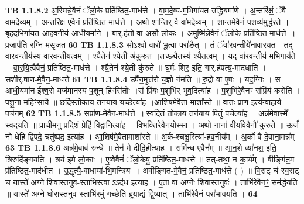 \documentclass[17pt]{extarticle}
\begin{document}
                                \textbf{ TB 1.1.8.2} \newline
                  अ॒स्मिन्ने॒वैनं॑ ॅलो॒के प्रति॑ष्ठित॒-माध॑त्ते । वा॒म॒दे॒व्य-म॒भिगा॑यत उद्ध्रि॒यमा॑णे । अ॒न्तरि॑क्षं॒ ॅवै वा॑मदे॒व्यम् । अ॒न्तरि॑क्ष ए॒वैनं॒ प्रति॑ष्ठित॒-माध॑त्ते । अथो॒ शान्ति॒र् वै वा॑मदे॒व्यम् । शा॒न्तमे॒वैनं॑ पश॒व्य॑मुद्ध॑रते । बृ॒हद॒भिगा॑यत आहव॒नीय॑ आधी॒यमा॑ने । बार्.ह॑तो॒ वा अ॒सौ लो॒कः । अ॒मुष्मि॑न्ने॒वैनं॑ ॅलो॒के प्रति॑ष्ठित॒-माध॑त्ते ॥ प्र॒जाप॑ति-र॒ग्नि-म॑सृजत \textbf{ 60} \newline
                  \newline
                                \textbf{ TB 1.1.8.3} \newline
                  सोऽश्वो॒ वारो॑ भू॒त्वा परा॑ङैत् । तं ॅवा॑रव॒न्तीये॑नावारयत ।तद्-वा॑रव॒न्तीय॑स्य वारवन्तीय॒त्वम् । श्यै॒तेन॑ श्ये॒ती अ॑कुरुत ।तच्छ्यै॒तस्य॑ श्यैत॒त्वम् । यद्-वा॑रव॒न्तीय॑-मभि॒गाय॑ते । वा॒र॒यि॒त्वैवैनं॒ प्रति॑ष्ठित॒-माध॑त्ते । श्यै॒तेन॑ श्ये॒ती कु॑रुते ॥ घ॒र्मः शिर॒ इति॒ गार्.ह॑पत्य॒-माद॑धाति । सशी॑र्.षाण-मे॒वैन॒-माध॑त्ते \textbf{ 61} \newline
                  \newline
                                \textbf{ TB 1.1.8.4} \newline
                  उपै॑न॒मुत्त॑रो य॒ज्ञो न॑मति ॥ रु॒द्रो वा ए॒षः । यद॒ग्निः । स आ॑धी॒यमा॑न ईश्व॒रो यज॑मानस्य प॒शून् हिꣳसि॑तोः ।सं प्रि॑यः प॒शुभि॑र् भुव॒दित्या॑ह । प॒शुभि॑रे॒वैनꣳ॒॒ संप्रि॑यं करोति ।प॒शू॒ना-महिꣳ॑सायै ॥ छ॒र्दिस्तो॒काय॒ तन॑याय य॒च्छेत्या॑ह ।आ॒शिष॑मे॒वैता-माशा᳚स्ते ॥ वातः॑ प्रा॒ण इत्य॑न्वाहार्य॒-पच॑नम् \textbf{ 62} \newline
                  \newline
                                \textbf{ TB 1.1.8.5} \newline
                  सप्रा॑ण-मे॒वैन॒-माध॑त्ते ॥ स्व॒दि॒तं तो॒काय॒ तन॑याय पि॒तुं प॒चेत्या॑ह । अन्न॑मे॒वास्मै᳚ स्वदयति ॥ प्राची॒मनु॑ प्र॒दिशं॒ प्रेहि॑ वि॒द्वानित्या॑ह । विभ॑क्तिरे॒वैन॑यो॒स्सा । अथो॒ नाना॑ वीर्यावे॒वैनौ॑ कुरुते ॥ ऊर्जं॑ नो धेहि द्वि॒पदे॒ चतु॑ष्पद॒ इत्या॑ह । आ॒शिष॑मे॒वैतामाशा᳚स्ते ॥ अ॒र्क-श्चक्षु॒रित्या॑-हव॒नीय᳚म् । अ॒र्को वै दे॒वाना॒मन्न᳚म् \textbf{ 63} \newline
                  \newline
                                \textbf{ TB 1.1.8.6} \newline
                  अन्न॑मे॒वाव॑ रुन्धे ॥ तेन॑ मे दीदि॒हीत्या॑ह । समि॑न्ध ए॒वैन᳚म् ॥ आ॒न॒शे व्या॑नश॒ इति॒ त्रिरुदि॑ङ्गयति । त्रय॑ इ॒मे लो॒काः । ए॒ष्वे॑वैनं॑ ॅलो॒केषु॒ प्रति॑ष्ठित॒-माध॑त्ते ॥ तत्-तथा॒ न का॒र्य᳚म् । वीङ्गि॑त॒म प्र॑तिष्ठित॒-माद॑धीत । उ॒द्धृत्यै॒-वाधाया॑-भि॒मन्त्रियः॑ । अवी᳚ङ्गित-मे॒वैनं॒ प्रति॑ष्ठित॒-माध॑त्ते ( ) ॥ वि॒राट् च॑ स्व॒राट् च॒ यास्ते॑ अग्ने शि॒वास्त॒नुव॒-स्ताभि॒स्त्वा ऽऽद॑ध॒ इत्या॑ह । ए॒ता वा अ॒ग्नेः शि॒वास्त॒नुवः॑ । ताभि॑रे॒वैनꣳ॒॒ सम॑र्द्धयति ॥ यास्ते॑ अग्ने घो॒रास्त॒नुव॒ स्ताभि॑र॒मुं ग॒च्छेति॑ ब्रूया॒द्यं द्वि॒ष्यात् । ताभि॑रे॒वैनं॒ परा॑भावयति । \textbf{ 64} \newline
\end{document}
